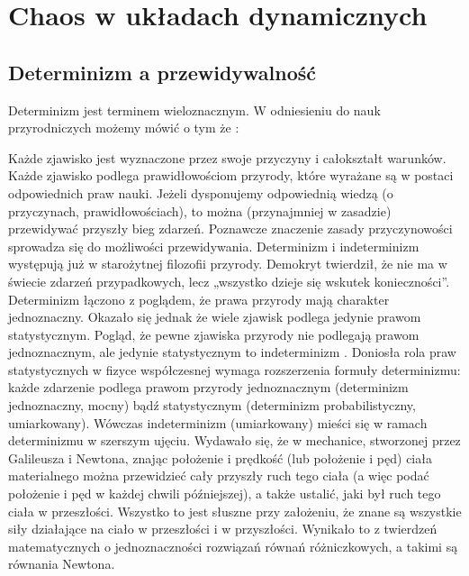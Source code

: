 \documentclass[a4paper,12pt,polish]{sphinxmanual}
\begin{document}
\chapter{Chaos w układach dynamicznych}
\label{index:chaos-w-ukladach-dynamicznych}

\section{Determinizm a przewidywalność}
\label{ch2/chII011:determinizm-a-przewidywalnosc}\label{ch2/chII011::doc}
Determinizm jest terminem wieloznacznym.  W odniesieniu do nauk przyrodniczych możemy mówić o tym że :

Każde zjawisko jest wyznaczone przez swoje przyczyny i całokształt warunków.
Każde zjawisko podlega prawidłowościom przyrody, które wyrażane są w postaci odpowiednich praw nauki.
Jeżeli dysponujemy odpowiednią wiedzą (o przyczynach,  prawidłowościach), to można (przynajmniej w zasadzie) przewidywać przyszły bieg zdarzeń.  Poznawcze znaczenie zasady przyczynowości  sprowadza się do możliwości przewidywania. Determinizm i indeterminizm  występują już w starożytnej filozofii przyrody. Demokryt twierdził, że nie ma w świecie zdarzeń przypadkowych, lecz „wszystko dzieje się wskutek konieczności''. Determinizm  łączono z poglądem, że prawa przyrody mają charakter jednoznaczny. Okazało się jednak że wiele zjawisk podlega jedynie prawom statystycznym. Pogląd, że pewne zjawiska przyrody nie podlegają prawom jednoznacznym, ale jedynie statystycznym to indeterminizm .  Doniosła rola praw statystycznych w fizyce współczesnej wymaga rozszerzenia formuły determinizmu: każde zdarzenie podlega prawom przyrody jednoznacznym (determinizm jednoznaczny, mocny) bądź statystycznym (determinizm probabilistyczny, umiarkowany). Wówczas indeterminizm (umiarkowany) mieści się w ramach determinizmu  w szerszym ujęciu. Wydawało się, że w mechanice, stworzonej przez Galileusza i Newtona, znając położenie i prędkość (lub położenie i pęd) ciała materialnego można przewidzieć cały przyszły ruch tego ciała (a więc podać położenie i pęd w każdej chwili późniejszej), a także ustalić, jaki był ruch tego ciała w przeszłości. Wszystko to jest słuszne  przy założeniu, że znane są  wszystkie siły działające na ciało w przeszłości i w przyszłości. Wynikało to z twierdzeń matematycznych o jednoznaczności rozwiązań równań różniczkowych, a takimi są równania Newtona.
\end{document}
